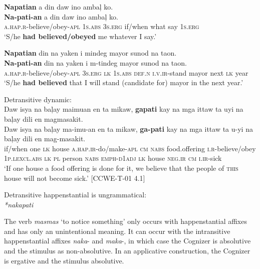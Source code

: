 \ea
\textbf{Napatian}  a  din  daw  ino  ambaļ  ko. \\\smallskip
\gll \textbf{Na-pati-an}  a  din  daw  ino  ambaļ  ko. \\
\textsc{a.hap.r}-believe/obey-\textsc{apl}  1\textsc{s.abs}  3\textsc{s.erg}  if/when  what  say  1\textsc{s.erg} \\
\glt ‘S/he \textbf{had believed/obeyed} me whatever I say.’
\z

\ea
\label{ex:thenextyear}
\textbf{Napatian}  din  na  yaken  i  mindeg  mayor sunod  na  taon. \\\smallskip
\gll \textbf{Na-pati-an}  din  na  yaken  i  m-tindeg  mayor sunod  na  taon. \\
\textsc{a.hap.r}-believe/obey-\textsc{apl}  3\textsc{s.erg}  \textsc{lk}  1\textsc{s.abs}  \textsc{def.n}  \textsc{i.v.ir}-stand  mayor next  \textsc{lk}  year \\
\glt `S/he \textbf{had believed} that I will stand (candidate for) mayor in the next year.’
\z

\ea
\label{ex:notbecomesick}
Detransitive dynamic: \\
Daw  isya  na  baļay  maimuan  en  ta  mikaw, \textbf{gapati}  kay  na  mga  ittaw  ta  uyi  na  baļay dili  en  magmasakit. \\\smallskip
\gll Daw  isya  na  baļay  ma-imu-an  en  ta  mikaw, \textbf{ga-pati}  kay  na  mga  ittaw  ta  u-yi  na  baļay dili  en  mag-masakit. \\
if/when  one  \textsc{lk}  house  \textsc{a.hap.ir}-do/make-\textsc{apl}  \textsc{cm}  \textsc{nabs}  food.offering
\textsc{i.r}-believe/obey  1\textsc{p.lexcl.abs}  \textsc{lk}  \textsc{pl}  person  \textsc{nabs}  \textsc{emph-d1adj}  \textsc{lk}  house
\textsc{neg.ir}  \textsc{cm}  \textsc{i.ir}-sick \\
\glt `If one house a food offering is done for it, we believe that the people of \textsc{this} house will not become sick.’ [CCWE-T-01 4.1]
\z

\ea
\label{ex:nakapati}
Detransitive happenstantial is ungrammatical: \\
\textit{*nakapati}
\z

The verb \textit{masmas} ‘to notice something’ only occurs with happenstantial affixes and has only an unintentional meaning. It can occur with the intransitive happenstantial affixes \textit{naka}- and \textit{maka}-, in which case the Cognizer is absolutive and the stimulus as non-absolutive. In an applicative construction, the Cognizer is ergative and the stimulus absolutive.

